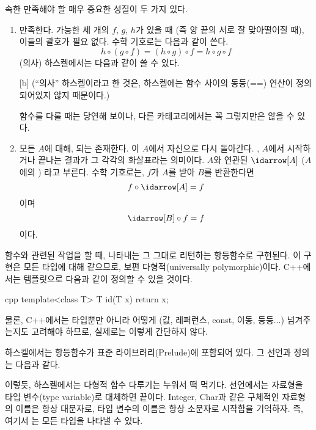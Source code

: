  속한 \trComposition\이 만족해야 할 매우 중요한 성질이 두 가지 있다.

\begin{enumerate}
\item
\trComposition\은 \trAssociativity\을 만족한다. \trComposition 가능한 세 개의 \trMorphism $f$, $g$, $h$가 있을 때
(즉 양 끝의 \trObject\가 서로 잘 맞아떨어질 때), 이들의  괄호가 필요 없다.
수학 기호로는 다음과 같이 쓴다.
\[h \circ (g \circ f) = (h \circ g) \circ f = h \circ g \circ f\]
(의사) 하스켈에서는 다음과 같이 쓸 수 있다.

[b]
(``의사'' 하스켈이라고 한 것은, 하스켈에는 함수 사이의 동등(==) 연산이 정의되어있지 않지 때문이다.)

\trAssociativity\은 함수를 다룰 때는 당연해 보이나, 다른 카테고리에서는 꼭 그렇지만은 않을 수 있다.

\item
모든 \trObject $A$에 대해,  \trUnit\이 되는 \trArrow\가 존재한다.
이 \trArrow\는 $A$에서 자신으로 다시 돌아간다. 
 , $A$에서 시작하거나 끝나는   결과가 그 각각의 화살표라는 의미이다.
\trObject $A$와 연관된 \trUnit \trArrow\는 $\idarrow[A]$ ($A$에의 \newterm{\trIdentity}) 라고 부른다.
수학 기호로는, $f$가 $A$를 받아 $B$를 반환한다면
\[f \circ \idarrow[A] = f\]
이며
\[\idarrow[B] \circ f = f\]
이다.
\end{enumerate}
함수와 관련된 작업을 할 때, \trIdentity\을 나타내는 \trArrow\는 그 \trArgument\를 그대로 리턴하는 항등함수로 구현된다.
이 구현은 모든 타입에 대해 같으므로, 보편 다형적(universally polymorphic)이다. 
C++에서는 템플릿으로 다음과 같이 정의할 수 있을 것이다.

\begin{snip}{cpp}
template<class T> T id(T x) { return x; }
\end{snip}
물론, C++에서는  타입뿐만 아니라 어떻게 (값, 레퍼런스, const, 이동, 등등...) \trArgument\를 넘겨주는지도 고려해야 하므로,
실제로는 이렇게 간단하지 않다.

하스켈에서는 항등함수가 표준 라이브러리(Prelude)에 포함되어 있다. 
그 선언과 정의는 다음과 같다.

이렇듯, 하스켈에서는 다형적 함수 다루기는 누워서 떡 먹기다.
선언에서는 자료형을 타입 변수(type variable)로 대체하면 끝이다.
Integer, Char과 같은 구체적인 자료형의 이름은 항상 대문자로, 타입 변수의 이름은 항상 소문자로 시작함을 기억하자.
즉, 여기서 는 모든 타입을 나타낼 수 있다.

